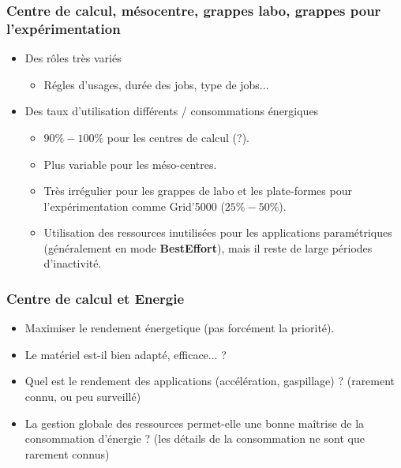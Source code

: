\documentclass{beamer}
\begin{document}
\begin{frame}
  \frametitle{Centre de calcul, mésocentre, grappes labo, grappes pour l'expérimentation}
  \begin{itemize}
		\item Des rôles très variés
    \begin{itemize}
      \item Régles d'usages, durée des jobs, type de jobs...    
    \end{itemize}

    \item Des taux d'utilisation différents / consommations énergiques
    \begin{itemize}
      \item $90\% - 100\%$ pour les centres de calcul (?).
      \item Plus variable pour les méso-centres.
      \item Très irrégulier pour les grappes de labo et les plate-formes pour l'expérimentation comme Grid'5000 ($25\% - 50\%$).
      \item Utilisation des ressources inutilisées pour les applications paramétriques (généralement en mode {\bf BestEffort}), mais il reste de large périodes d'inactivité. 
    \end{itemize}
  \end{itemize}
\end{frame}



\begin{frame}
  \frametitle{Centre de calcul et Energie}
  \begin{itemize}
		\item Maximiser le rendement énergetique (pas forcément la priorité). 
    \item Le matériel est-il bien adapté, efficace... ?
    \item Quel est le rendement des applications (accélération, gaspillage) ? (rarement connu, ou peu surveillé) 
    \item La gestion globale des ressources permet-elle une bonne maîtrise de la consommation d'énergie ? (les détails de la consommation ne sont que rarement connus)
  \end{itemize}
\end{frame}

\end{document}
